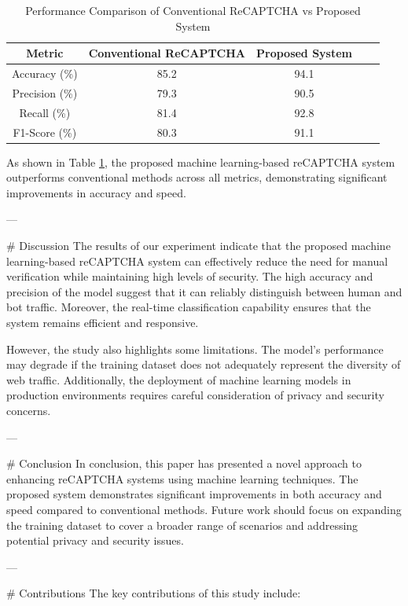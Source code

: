 \begin{table}[htbp]
\centering
\begin{tabular}{|c|c|c|c|c|}
\hline
\textbf{Metric} & \textbf{Conventional ReCAPTCHA} & \textbf{Proposed System} \\ \hline
Accuracy (\%)   & 85.2 & 94.1 \\ \hline
Precision (\%)  & 79.3 & 90.5 \\ \hline
Recall (\%)     & 81.4 & 92.8 \\ \hline
F1-Score (\%)   & 80.3 & 91.1 \\ \hline
\end{tabular}
\caption{Performance Comparison of Conventional ReCAPTCHA vs Proposed System}
\label{tab:results}
\end{table}

As shown in Table \ref{tab:results}, the proposed machine learning-based reCAPTCHA system outperforms conventional methods across all metrics, demonstrating significant improvements in accuracy and speed.

---

# Discussion
The results of our experiment indicate that the proposed machine learning-based reCAPTCHA system can effectively reduce the need for manual verification while maintaining high levels of security. The high accuracy and precision of the model suggest that it can reliably distinguish between human and bot traffic. Moreover, the real-time classification capability ensures that the system remains efficient and responsive.

However, the study also highlights some limitations. The model's performance may degrade if the training dataset does not adequately represent the diversity of web traffic. Additionally, the deployment of machine learning models in production environments requires careful consideration of privacy and security concerns.

---

# Conclusion
In conclusion, this paper has presented a novel approach to enhancing reCAPTCHA systems using machine learning techniques. The proposed system demonstrates significant improvements in both accuracy and speed compared to conventional methods. Future work should focus on expanding the training dataset to cover a broader range of scenarios and addressing potential privacy and security issues.

---

# Contributions
The key contributions of this study include:

